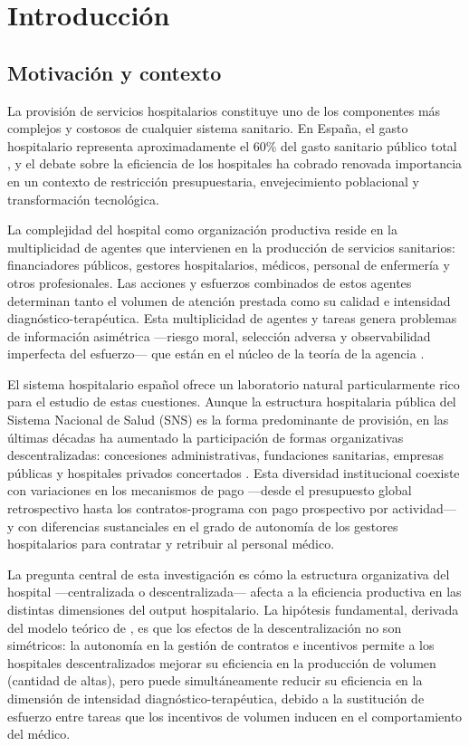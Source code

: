 \documentclass[12pt, a4paper, twoside, openright]{book}
\theoremstyle{plain}
\theoremstyle{definition}
\theoremstyle{remark}
\begin{document}
\chapter{Introducción}
\label{ch:intro}

\section{Motivación y contexto}

La provisión de servicios hospitalarios constituye uno de los componentes más complejos y costosos de cualquier sistema sanitario. En España, el gasto hospitalario representa aproximadamente el 60\% del gasto sanitario público total \citep{oecd2023}, y el debate sobre la eficiencia de los hospitales ha cobrado renovada importancia en un contexto de restricción presupuestaria, envejecimiento poblacional y transformación tecnológica.

La complejidad del hospital como organización productiva reside en la multiplicidad de agentes que intervienen en la producción de servicios sanitarios: financiadores públicos, gestores hospitalarios, médicos, personal de enfermería y otros profesionales. Las acciones y esfuerzos combinados de estos agentes determinan tanto el volumen de atención prestada como su calidad e intensidad diagnóstico-terapéutica. Esta multiplicidad de agentes y tareas genera problemas de información asimétrica ---riesgo moral, selección adversa y observabilidad imperfecta del esfuerzo--- que están en el núcleo de la teoría de la agencia \citep{laffont2002,bolton2005}.

El sistema hospitalario español ofrece un laboratorio natural particularmente rico para el estudio de estas cuestiones. Aunque la estructura hospitalaria pública del Sistema Nacional de Salud (SNS) es la forma predominante de provisión, en las últimas décadas ha aumentado la participación de formas organizativas descentralizadas: concesiones administrativas, fundaciones sanitarias, empresas públicas y hospitales privados concertados \citep{repullo2008}. Esta diversidad institucional coexiste con variaciones en los mecanismos de pago ---desde el presupuesto global retrospectivo hasta los contratos-programa con pago prospectivo por actividad--- y con diferencias sustanciales en el grado de autonomía de los gestores hospitalarios para contratar y retribuir al personal médico.

La pregunta central de esta investigación es cómo la estructura organizativa del hospital ---centralizada o descentralizada--- afecta a la eficiencia productiva en las distintas dimensiones del output hospitalario. La hipótesis fundamental, derivada del modelo teórico de \citet{izquierdo2019}, es que los efectos de la descentralización no son simétricos: la autonomía en la gestión de contratos e incentivos permite a los hospitales descentralizados mejorar su eficiencia en la producción de volumen (cantidad de altas), pero puede simultáneamente reducir su eficiencia en la dimensión de intensidad diagnóstico-terapéutica, debido a la sustitución de esfuerzo entre tareas que los incentivos de volumen inducen en el comportamiento del médico.
\end{document}
